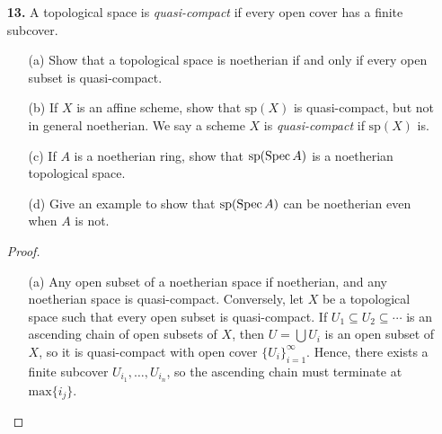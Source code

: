 \documentclass[a4paper]{article}
\begin{document}
\begin{enumerate} [label=\textbf{\arabic*.}, leftmargin=0em]
\begin{proof}
    Let $X = \coprod X_i / \sim$, where the equivalence relation identifies $U_{ij}$ with $U_{ji}$ for all $i \neq j$. It is a scheme topologically, that is there is an open cover of $X$ such that each element of the cover is homeomorphic to the spectra of some ring. We have already have a scheme struture on each open subset $X_i$ of $X$, so by Exercise 1.22 we can obtain a unique sheaf on $X$ satisfies the properties above. In particular, the structure sheaf of $X$ is given by
    \begin{equation*}
        \fO_X(V) = \{ \langle s_i \rangle_{i \in I} \mid s_i \in \fO_X(\iota_i^{-1}(V)) \text{ and } \varphi_{ij}(\restr{s_i}{\iota^{-1}_i(V) \cap U_{ij}}) = \restr{s_j}{\iota_j^{-1}(V) \cap U_j} \}.
    \end{equation*}
\end{proof}

\item[\textbf{13.}] A topological space is \textit{quasi-compact} if every open cover has a finite subcover.
\begin{itemize}
    \item[(a)] Show that a topological space is noetherian if and only if every open subset is quasi-compact.
    \item[(b)] If $X$ is an affine scheme, show that $\text{sp}(X)$ is quasi-compact, but not in general noetherian. We say a scheme $X$ is \textit{quasi-compact} if $\text{sp}(X)$ is.
    \item[(c)] If $A$ is a noetherian ring, show that $\text{sp}(\operatorname{Spec}{A})$ is a noetherian topological space.
    \item[(d)] Give an example to show that $\text{sp}(\operatorname{Spec}{A})$ can be noetherian even when $A$ is not.
\end{itemize}

\begin{proof} $ $ \vspace{0pt}
    \begin{itemize} [leftmargin=0cm]
        \item[(a)] Any open subset of a noetherian space if noetherian, and any noetherian space is quasi-compact. Conversely, let $X$ be a topological space such that every open subset is quasi-compact. If $U_1 \subseteq U_2 \subseteq \cdots$ is an ascending chain of open subsets of $X$, then $U = \bigcup U_i$ is an open subset of $X$, so it is quasi-compact with open cover $\{ U_i \}_{i = 1}^\infty$. Hence, there exists a finite subcover $U_{i_1}, \dots, U_{i_n}$, so the ascending chain must terminate at $\text{max}\{i_j \}$. 


\end{itemize}
\end{proof}
\end{enumerate}
\end{document}
